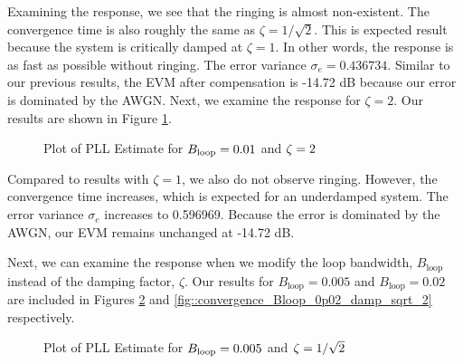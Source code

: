 \documentclass{article}
\begin{document}
\noindent Examining the response, we see that the ringing is almost non-existent. The convergence time is also roughly the same as $\zeta = 1/\sqrt{2}$. This is expected result because the system is critically damped at $\zeta = 1$. In other words, the response is as fast as possible without ringing. The error variance $\sigma_e=0.436734$. Similar to our previous results, the EVM after compensation is -14.72 dB because our error is dominated by the AWGN. Next, we examine the response for $\zeta = 2$. Our results are shown in Figure \ref{fig::convergence_Bloop_0p01_damp_2}.

\begin{figure}[H]
	\centerline{}
	\caption{Plot of PLL Estimate for $\protect{B_\text{loop}} = 0.01$ and $\protect{\zeta = 2}$}
	\label{fig::convergence_Bloop_0p01_damp_2}
\end{figure}

\noindent Compared to results with $\zeta = 1$, we also do not observe ringing. However, the convergence time increases, which is expected for an underdamped system. The error variance $\sigma_e$ increases to 0.596969. Because the error is dominated by the AWGN, our EVM remains unchanged at -14.72 dB.

Next, we can examine the response when we modify the loop bandwidth, $B_\text{loop}$ instead of the damping factor, $\zeta$. Our results for $B_\text{loop} = 0.005$ and $B_\text{loop} = 0.02$ are included in Figures \ref{fig::convergence_Bloop_0p005_damp_sqrt_2} and \ref{fig::convergence_Bloop_0p02_damp_sqrt_2} respectively.

\begin{figure}[H]
	\centerline{}
	\caption{Plot of PLL Estimate for $\protect{B_\text{loop}} = 0.005$ and $\protect{\zeta = 1/\sqrt{2}}$}
	\label{fig::convergence_Bloop_0p005_damp_sqrt_2}
\end{figure}
\end{document}
